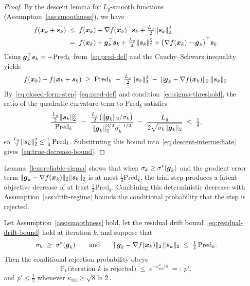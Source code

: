 \begin{proof}
By the descent lemma for $L_g$-smooth functions (Assumption~\ref{ass:smoothness}), we have
\begin{align*}
  f(\boldsymbol{x}_k + \boldsymbol{s}_k) 
  &\;\le\; f(\boldsymbol{x}_k) + \nabla f(\boldsymbol{x}_k)^\top \boldsymbol{s}_k + \tfrac{L_g}{2}\|\boldsymbol{s}_k\|_2^2 \\
  &\;=\; f(\boldsymbol{x}_k) + \boldsymbol{g}_k^\top \boldsymbol{s}_k + \tfrac{L_g}{2}\|\boldsymbol{s}_k\|_2^2 + \bigl(\nabla f(\boldsymbol{x}_k) - \boldsymbol{g}_k\bigr)^\top \boldsymbol{s}_k.
\end{align*}
Using $\boldsymbol{g}_k^\top \boldsymbol{s}_k = -\mathrm{Pred}_k$ from~\eqref{eq:pred-def} and the Cauchy--Schwarz inequality yields
\begin{equation}\label{eq:descent-intermediate}
  f(\boldsymbol{x}_k) - f(\boldsymbol{x}_k + \boldsymbol{s}_k) \;\ge\; \mathrm{Pred}_k \;-\; \tfrac{L_g}{2}\|\boldsymbol{s}_k\|_2^2 \;-\; \|\boldsymbol{g}_k - \nabla f(\boldsymbol{x}_k)\|_2\,\|\boldsymbol{s}_k\|_2.
\end{equation}
By~\eqref{eq:closed-form-step}--\eqref{eq:pred-def} and condition~\eqref{eq:sigma-threshold}, the ratio of the quadratic curvature term to $\mathrm{Pred}_k$ satisfies
\begin{equation*}
  \frac{\tfrac{L_g}{2}\|\boldsymbol{s}_k\|_2^2}{\mathrm{Pred}_k}
  \;=\;
  \frac{\tfrac{L_g}{2}\bigl(\|\boldsymbol{g}_k\|_2 / \sigma_k\bigr)}{\|\boldsymbol{g}_k\|_2^{3/2} \sigma_k^{-1/2}}
  \;=\;
  \frac{L_g}{2\sqrt{\sigma_k \|\boldsymbol{g}_k\|_2}}
  \;\le\; \tfrac{1}{4},
\end{equation*}
so $\tfrac{L_g}{2}\|\boldsymbol{s}_k\|_2^2 \le \tfrac{1}{4}\,\mathrm{Pred}_k$. Substituting this bound into~\eqref{eq:descent-intermediate} gives~\eqref{eq:true-decrease-bound}.
\end{proof}

Lemma~\ref{lem:reliable-sigma} shows that when $\sigma_k \ge \sigma^*(\boldsymbol{g}_k)$ and the gradient error term $\|\boldsymbol{g}_k - \nabla f(\boldsymbol{x}_k)\|_2 \|\boldsymbol{s}_k\|_2$ is at most $\tfrac{1}{4}\mathrm{Pred}_k$, the trial step produces a latent objective decrease of at least $\tfrac{1}{2}\mathrm{Pred}_k$. Combining this deterministic decrease with Assumption~\ref{ass:drift-regime} bounds the conditional probability that the step is rejected.

\begin{lemma}
\label{lem:reject-prob}
Let Assumption~\ref{ass:smoothness} hold, let the residual drift bound~\eqref{eq:residual-drift-bound} hold at iteration $k$, and suppose that
\begin{equation}\label{eq:reliable-conditions}
  \sigma_k \;\ge\; \sigma^*(\boldsymbol{g}_k)
  \qquad\text{and}\qquad
  \|\boldsymbol{g}_k - \nabla f(\boldsymbol{x}_k)\|_2\,\|\boldsymbol{s}_k\|_2 \;\le\; \tfrac{1}{4}\,\mathrm{Pred}_k.
\end{equation}
Then the conditional rejection probability obeys
\begin{equation*}
  \mathbb{P}_k\bigl(\text{iteration } k \text{ is rejected}\bigr)
  \;\le\;
  e^{-\kappa_{\mathrm{tol}}^2/8}
  \;=:\; p',
\end{equation*}
and $p' \le \tfrac{1}{2}$ whenever $\kappa_{\mathrm{tol}} \ge \sqrt{8\ln 2}$.
\end{lemma}

